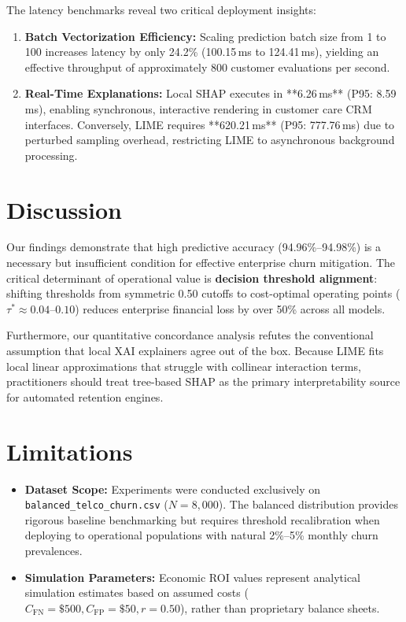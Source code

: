 \documentclass[conference]{IEEEtran}
\begin{document}
The latency benchmarks reveal two critical deployment insights:
\begin{enumerate}
    \item \textbf{Batch Vectorization Efficiency:} Scaling prediction batch size from 1 to 100 increases latency by only 24.2\% (100.15\,ms to 124.41\,ms), yielding an effective throughput of approximately 800 customer evaluations per second.
    \item \textbf{Real-Time Explanations:} Local SHAP executes in **6.26\,ms** (P95: 8.59\,ms), enabling synchronous, interactive rendering in customer care CRM interfaces. Conversely, LIME requires **620.21\,ms** (P95: 777.76\,ms) due to perturbed sampling overhead, restricting LIME to asynchronous background processing.
\end{enumerate}

\section{Discussion}
Our findings demonstrate that high predictive accuracy (94.96\%--94.98\%) is a necessary but insufficient condition for effective enterprise churn mitigation. The critical determinant of operational value is \textbf{decision threshold alignment}: shifting thresholds from symmetric 0.50 cutoffs to cost-optimal operating points ($\tau^* \approx 0.04$--$0.10$) reduces enterprise financial loss by over 50\% across all models.

Furthermore, our quantitative concordance analysis refutes the conventional assumption that local XAI explainers agree out of the box. Because LIME fits local linear approximations that struggle with collinear interaction terms, practitioners should treat tree-based SHAP as the primary interpretability source for automated retention engines.

\section{Limitations}
\begin{itemize}
    \item \textbf{Dataset Scope:} Experiments were conducted exclusively on \texttt{balanced\_telco\_churn.csv} ($N=8,000$). The balanced distribution provides rigorous baseline benchmarking but requires threshold recalibration when deploying to operational populations with natural 2\%--5\% monthly churn prevalences.
    \item \textbf{Simulation Parameters:} Economic ROI values represent analytical simulation estimates based on assumed costs ($C_{\text{FN}}=\$500, C_{\text{FP}}=\$50, r=0.50$), rather than proprietary balance sheets.
\end{itemize}
\end{document}
